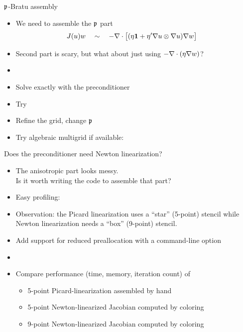 \begin{frame}{${\mathfrak p}$-Bratu assembly}
  \begin{itemize}
  \item We need to assemble the ${\mathfrak p}$ part
    \begin{align*}
      J(u)w \quad &\sim\quad -\nabla \cdot \big[(\eta\bm 1 + \eta' \nabla u \otimes \nabla u) \nabla w\big]
    \end{align*}
  \item Second part is scary, but what about just using $-\nabla \cdot (\eta\nabla w)$?
  \item {}
  \item Solve exactly with the preconditioner 
  \item Try 
  \item Refine the grid, change ${\mathfrak p}$
  \item Try algebraic multigrid if available: 
  \end{itemize}
\end{frame}

\begin{frame}{Does the preconditioner need Newton linearization?}
  \begin{itemize}
  \item The anisotropic part looks messy.  \\
    \alert{Is it worth writing the code to assemble that part?}
  \item Easy profiling: 
  \item Observation: the Picard linearization uses a ``star'' (5-point)
    stencil while Newton linearization needs a ``box'' (9-point) stencil.
  \item Add support for reduced preallocation with a command-line option
  \item {}
  \item Compare performance (time, memory, iteration count) of
    \begin{itemize}
    \item 5-point Picard-linearization assembled by hand
    \item 5-point Newton-linearized Jacobian computed by coloring
    \item 9-point Newton-linearized Jacobian computed by coloring
    \end{itemize}
  \end{itemize}
\end{frame}

